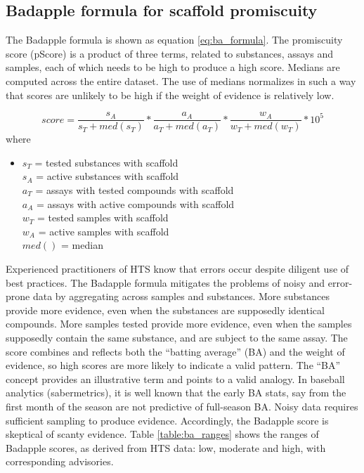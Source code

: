 \subsection{Badapple formula for scaffold promiscuity}

The Badapple formula is shown as equation \ref{eq:ba_formula}. The promiscuity score (pScore) is a product of three terms, related to substances, assays and samples, each of which needs to be high to produce a high score. Medians are computed across the entire dataset. The use of medians normalizes in such a way that scores are unlikely to be high if the weight of evidence is relatively low.

\begin{equation}
score = \frac{s_A}{s_T + med(s_T)} * \frac{a_A}{a_T + med(a_T)} * \frac{w_A}{w_T + med(w_T)} * 10^5
\label{eq:ba_formula}
\end{equation}
where\\
\begin{itemize}
\item[] $s_T$ = tested substances with scaffold\\ 
$s_A$ = active substances with scaffold\\ 
$a_T$ = assays with tested compounds with scaffold\\
$a_A$ = assays with active compounds with scaffold\\ 
$w_T$ = tested samples with scaffold\\
$w_A$ = active samples with scaffold\\
$med()$ = median
\end{itemize}

Experienced practitioners of HTS know that errors occur despite diligent use of best practices. The Badapple formula mitigates the problems of noisy and error-prone data by aggregating across samples and substances. More substances provide more evidence, even when the substances are supposedly identical compounds. More samples tested provide more evidence, even when the samples supposedly contain the same substance, and are subject to the same assay. The score combines and reflects both the “batting average” (BA) and the weight of evidence, so high scores are more likely to indicate a valid pattern. The “BA” concept provides an illustrative term and points to a valid analogy. In baseball analytics (sabermetrics), it is well known that the early BA stats, say from the first month of the season are not predictive of full-season BA\cite{Draper2013-at}. Noisy data requires sufficient sampling to produce evidence. Accordingly, the Badapple score is skeptical of scanty evidence. Table \ref{table:ba_ranges} shows the ranges of Badapple scores, as derived from HTS data: low, moderate and high, with corresponding advisories.


